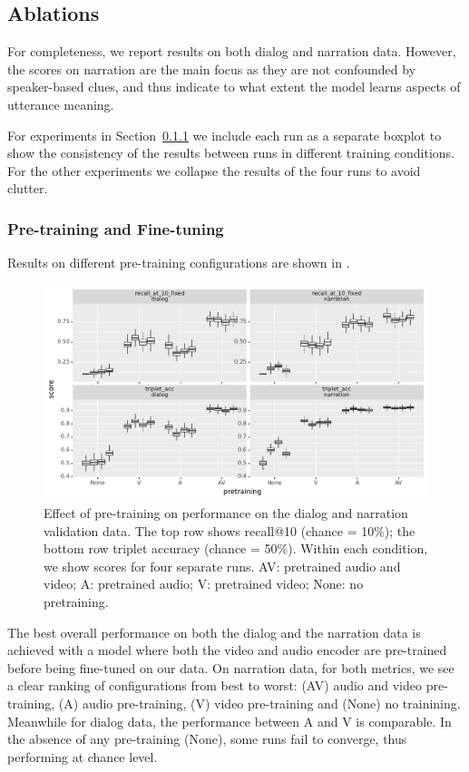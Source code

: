 \subsection{Ablations}
\label{sec:ablations}
For completeness, we report results on both dialog and narration
data. However, the scores on narration are the main focus as they are
not confounded by speaker-based clues, and thus indicate to what
extent the model learns aspects of utterance meaning.

For experiments in Section~\ref{sec:pretraining} we include each run as a separate boxplot
to show the consistency of the results between runs in
different training conditions.  For the other experiments we collapse
the results of the four runs to avoid clutter.

\subsubsection{Pre-training and Fine-tuning}
\label{sec:pretraining}

Results on different pre-training configurations are shown in
.
\begin{figure}[htb]
	\centering
	\includegraphics[width=\textwidth]{results/ablations/pretraining.pdf}
	\caption{Effect of pre-training on performance on the dialog
          and narration validation data. The top row shows recall@10
          (chance = 10\%); the bottom row triplet accuracy (chance =
          50\%). Within each condition, we show scores for four
          separate runs. AV: pretrained audio and video; A: pretrained
          audio; V: pretrained video; None: no pretraining.}
	\label{fig:pretraining}
      \end{figure}

The best overall performance on both the dialog and the narration data is 
achieved with a model where both the video and audio encoder are pre-trained 
before being fine-tuned on our data. On narration data, for both metrics,
we see a clear ranking of
configurations from best to worst: (AV) audio and video pre-training,
(A) audio pre-training, (V) video pre-training and (None) no
trainining. Meanwhile for dialog data, the performance between A and V
is comparable. In the absence of any pre-training (None),
some runs fail to converge, thus performing at chance level.

